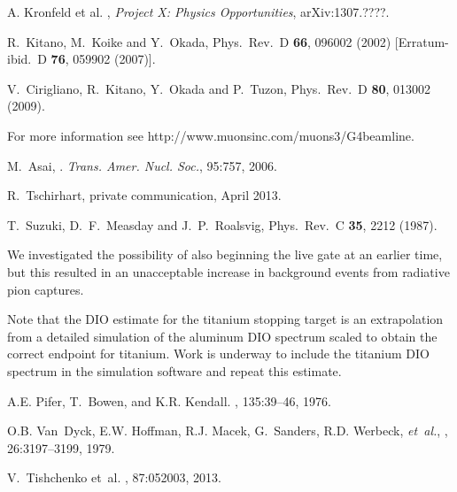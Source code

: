 \begin{thebibliography}{99}
 A. Kronfeld et al. , 
  {\it{Project X: Physics Opportunities}}, arXiv:1307.????.

  R.~Kitano, M.~Koike and Y.~Okada,
  Phys.\ Rev.\ D {\bf 66}, 096002 (2002)
  [Erratum-ibid.\ D {\bf 76}, 059902 (2007)].

  V.~Cirigliano, R.~Kitano, Y.~Okada and P.~Tuzon,
  Phys.\ Rev.\ D {\bf 80}, 013002 (2009).

 For more information see http://www.muonsinc.com/muons3/G4beamline.

M.~Asai,
.
\emph{Trans. Amer. Nucl. Soc.}, 95:757, 2006.

 R.~Tschirhart, private communication, April 2013.

  T.~Suzuki, D.~F.~Measday and J.~P.~Roalsvig,
  Phys.\ Rev.\ C {\bf 35}, 2212 (1987).

 We investigated the possibility of also
beginning the live gate at an earlier time, but this resulted in an
unacceptable increase in background events from radiative pion
captures.


 Note that the DIO estimate for the titanium
stopping target is an extrapolation from a detailed simulation of the
aluminum DIO spectrum scaled to obtain the correct endpoint for
titanium.  Work is underway to include the titanium DIO spectrum in
the simulation software and repeat this estimate.



A.E. Pifer, T.~Bowen, and K.R. Kendall.
, 135:39--46, 1976.

O.B. Van~Dyck, E.W. Hoffman, R.J. Macek, G.~Sanders, R.D. Werbeck, {\it et~al.},
, 26:3197--3199, 1979.

V.~Tishchenko et~al.
, 87:052003, 2013.


\end{thebibliography}
